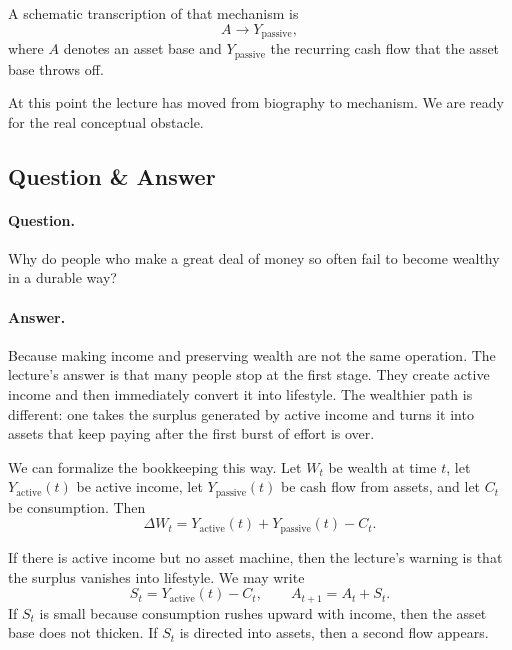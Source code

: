 A schematic transcription of that mechanism is
\begin{equation}
A \longrightarrow Y_{\mathrm{passive}},
\end{equation}
where \(A\) denotes an asset base and \(Y_{\mathrm{passive}}\) the recurring cash flow that the asset base throws off.

At this point the lecture has moved from biography to mechanism. We are ready for the real conceptual obstacle.

\subsection{Question \& Answer}

\paragraph{Question.} Why do people who make a great deal of money so often fail to become wealthy in a durable way?

\paragraph{Answer.} Because making income and preserving wealth are not the same operation. The lecture's answer is that many people stop at the first stage. They create active income and then immediately convert it into lifestyle. The wealthier path is different: one takes the surplus generated by active income and turns it into assets that keep paying after the first burst of effort is over.

We can formalize the bookkeeping this way. Let \(W_t\) be wealth at time \(t\), let \(Y_{\mathrm{active}}(t)\) be active income, let \(Y_{\mathrm{passive}}(t)\) be cash flow from assets, and let \(C_t\) be consumption. Then
\begin{equation}
\Delta W_t = Y_{\mathrm{active}}(t) + Y_{\mathrm{passive}}(t) - C_t.
\end{equation}

If there is active income but no asset machine, then the lecture's warning is that the surplus vanishes into lifestyle. We may write
\begin{equation}
S_t = Y_{\mathrm{active}}(t) - C_t,\qquad A_{t+1}=A_t+S_t.
\end{equation}
If \(S_t\) is small because consumption rushes upward with income, then the asset base does not thicken. If \(S_t\) is directed into assets, then a second flow appears.

